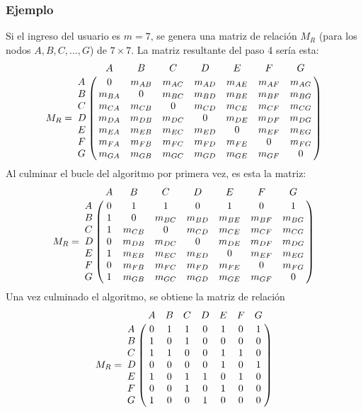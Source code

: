 \documentclass[12pt]{article}
\begin{document}
\subsubsection{Ejemplo}
Si el ingreso del usuario es $m=7$, se genera una matriz de relaci\'{o}n $M_{R}$ (para los nodos $A, B, C, ..., G$) de $7\times 7$. La matriz resultante del paso 4 ser\'{i}a esta:
$$M_{R}=
\bordermatrix{
     &     A     &     B          &     C          &     D          &     E          &     F          &     G          \cr
A    &     0     &     m_{AB}     &     m_{AC}     &     m_{AD}     &     m_{AE}     &     m_{AF}     &     m_{AG}     \cr
B    &     m_{BA}&     0          &     m_{BC}     &     m_{BD}     &     m_{BE}     &     m_{BF}     &     m_{BG}     \cr
C    &     m_{CA}&     m_{CB}     &     0          &     m_{CD}     &     m_{CE}     &     m_{CF}     &     m_{CG}     \cr
D    &     m_{DA}&     m_{DB}     &     m_{DC}     &     0          &     m_{DE}     &     m_{DF}     &     m_{DG}     \cr
E    &     m_{EA}&     m_{EB}     &     m_{EC}     &     m_{ED}     &     0          &     m_{EF}     &     m_{EG}     \cr
F    &     m_{FA}&     m_{FB}     &     m_{FC}     &     m_{FD}     &     m_{FE}     &     0          &     m_{FG}     \cr
G    &     m_{GA}&     m_{GB}     &     m_{GC}     &     m_{GD}     &     m_{GE}     &     m_{GF}     &     0     \cr
}
$$
Al culminar el bucle del algoritmo por primera vez, es esta la matriz:
$$M_{R}=
\bordermatrix{
     &     A     &     B          &     C          &     D          &     E          &     F          &     G          \cr
A    &     0     &     1          &     1          &     0          &     1          &     0          &     1          \cr
B    &     1     &     0          &     m_{BC}     &     m_{BD}     &     m_{BE}     &     m_{BF}     &     m_{BG}     \cr
C    &     1     &     m_{CB}     &     0          &     m_{CD}     &     m_{CE}     &     m_{CF}     &     m_{CG}     \cr
D    &     0     &     m_{DB}     &     m_{DC}     &     0          &     m_{DE}     &     m_{DF}     &     m_{DG}     \cr
E    &     1     &     m_{EB}     &     m_{EC}     &     m_{ED}     &     0          &     m_{EF}     &     m_{EG}     \cr
F    &     0     &     m_{FB}     &     m_{FC}     &     m_{FD}     &     m_{FE}     &     0          &     m_{FG}     \cr
G    &     1     &     m_{GB}     &     m_{GC}     &     m_{GD}     &     m_{GE}     &     m_{GF}     &     0     \cr
}
$$
Una vez culminado el algoritmo, se obtiene la matriz de relaci\'{o}n
$$M_{R}=
\bordermatrix{
 &A&B&C&D&E&F&G\cr
A&0&1&1&0&1&0&1\cr
B&1&0&1&0&0&0&0\cr
C&1&1&0&0&1&1&0\cr
D&0&0&0&0&1&0&1\cr
E&1&0&1&1&0&1&0\cr
F&0&0&1&0&1&0&0\cr
G&1&0&0&1&0&0&0\cr
}
$$
\end{document}
